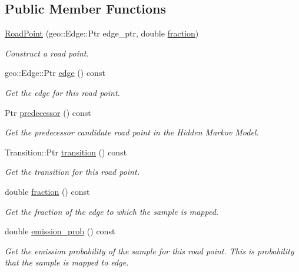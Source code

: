 \subsection*{Public Member Functions}
\begin{DoxyCompactItemize}
\item 
\hyperlink{classhmm__mm_1_1RoadPoint_a6e011235953e681f770ee5e77b9aa4b1}{Road\+Point} (geo\+::\+Edge\+::\+Ptr edge\+\_\+ptr, double \hyperlink{classhmm__mm_1_1RoadPoint_adccfe10456ad5ae7ca02a224c0b8cf73}{fraction})
\begin{DoxyCompactList}\small\item\em Construct a road point. \end{DoxyCompactList}\item 
geo\+::\+Edge\+::\+Ptr \hyperlink{classhmm__mm_1_1RoadPoint_af8184b73f9d3ce90b512654fcb68867e}{edge} () const 
\begin{DoxyCompactList}\small\item\em Get the edge for this road point. \end{DoxyCompactList}\item 
Ptr \hyperlink{classhmm__mm_1_1RoadPoint_a0632d0d91d9cf167943707fd4619e7c4}{predecessor} () const 
\begin{DoxyCompactList}\small\item\em Get the predecessor candidate road point in the Hidden Markov Model. \end{DoxyCompactList}\item 
Transition\+::\+Ptr \hyperlink{classhmm__mm_1_1RoadPoint_a3dcf1bf6911a716c3ebf308ef4db2b08}{transition} () const 
\begin{DoxyCompactList}\small\item\em Get the transition for this road point. \end{DoxyCompactList}\item 
double \hyperlink{classhmm__mm_1_1RoadPoint_adccfe10456ad5ae7ca02a224c0b8cf73}{fraction} () const 
\begin{DoxyCompactList}\small\item\em Get the fraction of the edge to which the sample is mapped. \end{DoxyCompactList}\item 
double \hyperlink{classhmm__mm_1_1RoadPoint_a85a03fe45e41698173a88af613a15a98}{emission\+\_\+prob} () const 
\begin{DoxyCompactList}\small\item\em Get the emission probability of the sample for this road point. This is probability that the sample is mapped to edge. \end{DoxyCompactList}\item 

\end{DoxyCompactItemize}
